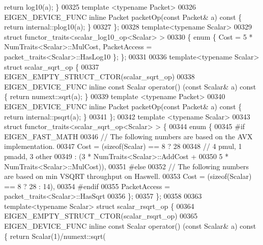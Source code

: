 \begin{DoxyCode}
{      return} log10(a); \}
00325   \textcolor{keyword}{template} <\textcolor{keyword}{typename} Packet>
00326   EIGEN\_DEVICE\_FUNC \textcolor{keyword}{inline} Packet packetOp(\textcolor{keyword}{const} Packet& a)\textcolor{keyword}{ const }\{ \textcolor{keywordflow}{return} internal::plog10(a); \}
00327 \};
00328 \textcolor{keyword}{template}<\textcolor{keyword}{typename} Scalar>
00329 \textcolor{keyword}{struct }functor\_traits<scalar\_log10\_op<Scalar> >
00330 \{ \textcolor{keyword}{enum} \{ Cost = 5 * NumTraits<Scalar>::MulCost, PacketAccess = packet\_traits<Scalar>::HasLog10 \}; \};
00331 
00336 \textcolor{keyword}{template}<\textcolor{keyword}{typename} Scalar> \textcolor{keyword}{struct }scalar\_sqrt\_op \{
00337   EIGEN\_EMPTY\_STRUCT\_CTOR(scalar\_sqrt\_op)
00338   EIGEN\_DEVICE\_FUNC \textcolor{keyword}{inline} \textcolor{keyword}{const} Scalar operator() (\textcolor{keyword}{const} Scalar& a)\textcolor{keyword}{ const }\{ \textcolor{keywordflow}{return} numext::sqrt(a); \}
00339   \textcolor{keyword}{template} <\textcolor{keyword}{typename} Packet>
00340   EIGEN\_DEVICE\_FUNC \textcolor{keyword}{inline} Packet packetOp(\textcolor{keyword}{const} Packet& a)\textcolor{keyword}{ const }\{ \textcolor{keywordflow}{return} internal::psqrt(a); \}
00341 \};
00342 \textcolor{keyword}{template} <\textcolor{keyword}{typename} Scalar>
00343 \textcolor{keyword}{struct }functor\_traits<scalar\_sqrt\_op<Scalar> > \{
00344   \textcolor{keyword}{enum} \{
00345 \textcolor{preprocessor}{#if EIGEN\_FAST\_MATH}
00346     \textcolor{comment}{// The following numbers are based on the AVX implementation.}
00347     Cost = (\textcolor{keyword}{sizeof}(Scalar) == 8 ? 28
00348                                 \textcolor{comment}{// 4 pmul, 1 pmadd, 3 other}
00349                                 : (3 * NumTraits<Scalar>::AddCost +
00350                                    5 * NumTraits<Scalar>::MulCost)),
00351 #\textcolor{keywordflow}{else}
00352     \textcolor{comment}{// The following numbers are based on min VSQRT throughput on Haswell.}
00353     Cost = (\textcolor{keyword}{sizeof}(Scalar) == 8 ? 28 : 14),
00354 #endif
00355     PacketAccess = packet\_traits<Scalar>::HasSqrt
00356   \};
00357 \};
00358 
00363 \textcolor{keyword}{template}<\textcolor{keyword}{typename} Scalar> \textcolor{keyword}{struct }scalar\_rsqrt\_op \{
00364   EIGEN\_EMPTY\_STRUCT\_CTOR(scalar\_rsqrt\_op)
00365   EIGEN\_DEVICE\_FUNC \textcolor{keyword}{inline} \textcolor{keyword}{const} Scalar operator() (\textcolor{keyword}{const} Scalar& a)\textcolor{keyword}{ const }\{ \textcolor{keywordflow}{return} Scalar(1)/numext::sqrt(

\end{DoxyCode}
